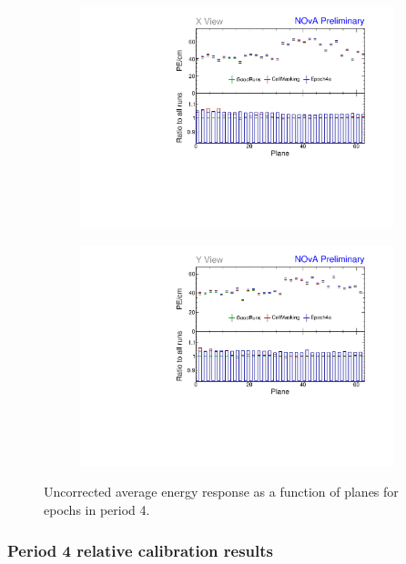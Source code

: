 \begin{figure}[!hbtp]
\centering
\begin{subfigure}[b]{0.495\textwidth}
\centering
\includegraphics[width=\textwidth]{PlotsTBCalibTechnote/Attenprofs_P4Data_PlanePE_X_Combined.pdf}
\end{subfigure}
\begin{subfigure}[b]{0.495\textwidth}
\centering
\includegraphics[width=\textwidth]{PlotsTBCalibTechnote/Attenprofs_P4Data_PlanePE_Y_Combined.pdf}
\end{subfigure}
\caption{Uncorrected average energy response as a function of planes for epochs in period 4.}
\label{fig:CalibhistPlanePE_period4}
\end{figure}

\subsubsection*{Period 4 relative calibration results}

